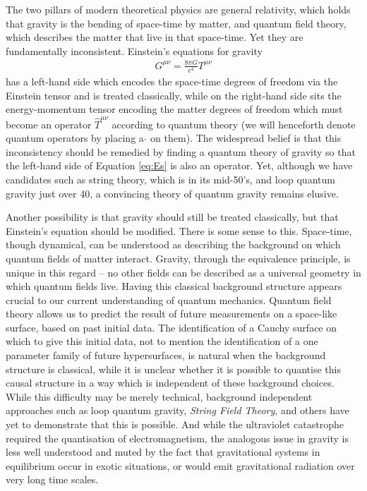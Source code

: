\documentclass[aps,pra,showpacs,citeautoscript,amsmath,amssymb,floatfix,superscriptaddress,bbm, verbatim,amsfonts,changes,12pt,nofootinbib,longbibliography]{revtex4-2}
\begin{document}
The two pillars of modern theoretical physics are general relativity, which holds that gravity is the bending of space-time by matter, and quantum field theory, which describes the matter that live in that space-time. Yet they are fundamentally inconsistent. Einstein's equations for gravity
\begin{align}
G^{\mu\nu}
=\frac{8\pi G}{c^4}{T}^{\mu\nu}
\label{eq:Es}
\end{align}
has a left-hand side which encodes the space-time degrees of freedom via the Einstein tensor and is treated classically, while on the right-hand side sits the energy-momentum tensor encoding the matter degrees of freedom which must become an operator $\hat{T}^{\mu\nu}$ according to quantum theory (we will henceforth denote quantum operators by placing a $\hat{}$ on them)\label{par:hat}.
The widespread belief is that this inconsistency should be remedied by finding a quantum theory of gravity so that the left-hand side of Equation \eqref{eq:Es} is also an operator. Yet, although we have candidates such as string theory, which is in its mid-50's\cite{veneziano1968construction}, and loop quantum gravity just over 40\cite{sen1982gravity,ashtekar1986new,rovelli1988knot}, a convincing theory of quantum gravity remains elusive.

Another possibility is that gravity should still be treated classically, but that Einstein's  equation should be modified. There is some sense to this. Space-time, though dynamical, can be understood as describing the background on which quantum fields of matter interact. Gravity, through the equivalence principle, is unique in this regard --
no other fields can be described as a universal geometry in which quantum fields live.  
Having this classical background structure appears crucial to our current understanding of quantum mechanics. Quantum field theory allows us to predict the result of future measurements on a space-like surface, based on past initial data. The identification of a Cauchy surface on which to give this initial data, not to mention the identification of a one parameter family of future hypersurfaces, is natural when the background structure is classical, while it is unclear whether it is possible to quantise this causal structure in a way which is independent of these background choices. While this difficulty may be merely technical, background independent approaches such as loop quantum gravity, {\it String Field Theory}\cite{PhysRevD.46.5467}, and others\cite{hardy2005probability,oreshkov2012quantum} have yet to demonstrate that this is possible.
And while the ultraviolet 
catastrophe required the quantisation of electromagnetism, the analogous issue in gravity is less well understood\cite{smolin1984thermodynamics} and muted by the fact that gravitational systems in equilibrium occur in exotic situations\cite{hawking1983thermodynamics}, or would emit gravitational radiation over very long time scales\cite{Simidzija_2021}. \label{par:uv}
\end{document}
